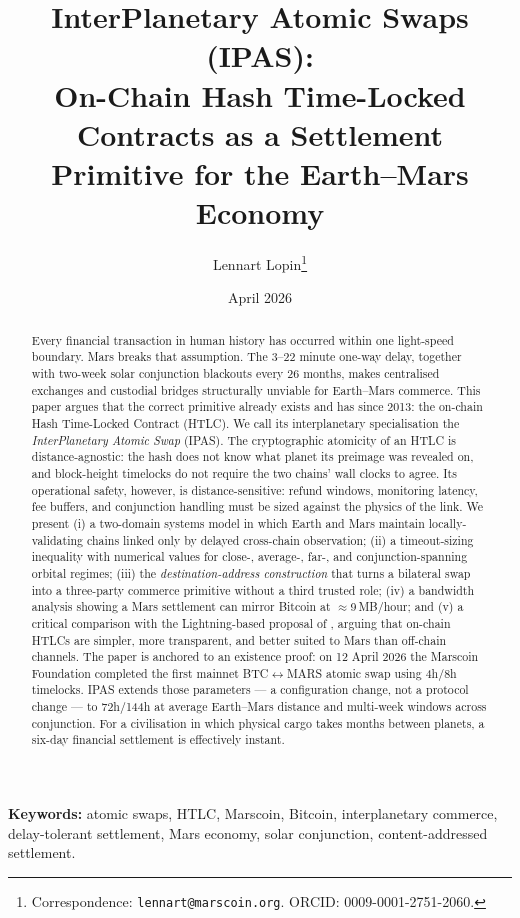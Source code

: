 \documentclass[11pt]{article}
\title{\textbf{InterPlanetary Atomic Swaps (IPAS):\\
  On-Chain Hash Time-Locked Contracts as a Settlement\\
  Primitive for the Earth--Mars Economy}}
\author[1]{Lennart Lopin\thanks{Correspondence: \texttt{lennart@marscoin.org}. %
  ORCID: 0009-0001-2751-2060.}}
\affil[1]{Marscoin Foundation}
\date{April 2026}
\begin{document}
\maketitle
\thispagestyle{empty}

\begin{abstract}
\noindent
Every financial transaction in human history has occurred within one light-speed boundary. Mars breaks that assumption. The 3--22 minute one-way delay, together with two-week solar conjunction blackouts every 26 months, makes centralised exchanges and custodial bridges structurally unviable for Earth--Mars commerce. This paper argues that the correct primitive already exists and has since 2013: the on-chain Hash Time-Locked Contract (HTLC). We call its interplanetary specialisation the \emph{InterPlanetary Atomic Swap} (IPAS). The cryptographic atomicity of an HTLC is distance-agnostic: the hash does not know what planet its preimage was revealed on, and block-height timelocks do not require the two chains' wall clocks to agree. Its operational safety, however, is distance-sensitive: refund windows, monitoring latency, fee buffers, and conjunction handling must be sized against the physics of the link. We present (i) a two-domain systems model in which Earth and Mars maintain locally-validating chains linked only by delayed cross-chain observation; (ii) a timeout-sizing inequality with numerical values for close-, average-, far-, and conjunction-spanning orbital regimes; (iii) the \emph{destination-address construction} that turns a bilateral swap into a three-party commerce primitive without a third trusted role; (iv) a bandwidth analysis showing a Mars settlement can mirror Bitcoin at $\approx$9\,MB/hour; and (v) a critical comparison with the Lightning-based proposal of \citet{puente2025}, arguing that on-chain HTLCs are simpler, more transparent, and better suited to Mars than off-chain channels. The paper is anchored to an existence proof: on 12 April 2026 the Marscoin Foundation completed the first mainnet BTC$\leftrightarrow$MARS atomic swap using 4h/8h timelocks. IPAS extends those parameters --- a configuration change, not a protocol change --- to 72h/144h at average Earth--Mars distance and multi-week windows across conjunction. For a civilisation in which physical cargo takes months between planets, a six-day financial settlement is effectively instant.
\end{abstract}

\smallskip
\noindent\textbf{Keywords:} atomic swaps, HTLC, Marscoin, Bitcoin, interplanetary commerce, delay-tolerant settlement, Mars economy, solar conjunction, content-addressed settlement.
\end{document}

